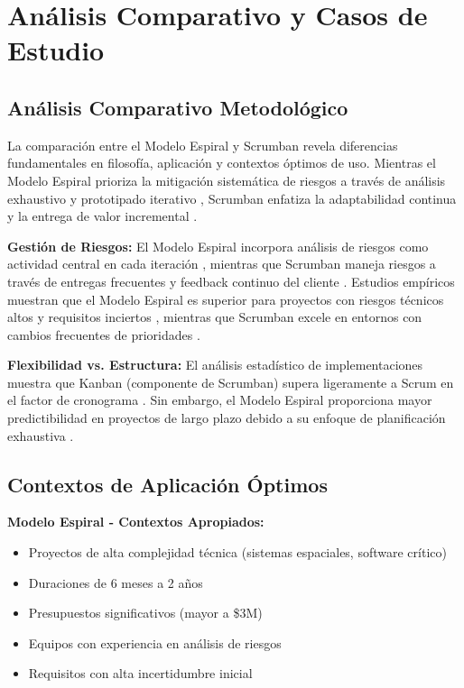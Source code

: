 \documentclass[conference]{IEEEtran}
\begin{document}
\section{Análisis Comparativo y Casos de Estudio}

\subsection{Análisis Comparativo Metodológico}

La comparación entre el Modelo Espiral y Scrumban revela diferencias fundamentales en filosofía, aplicación y contextos óptimos de uso. Mientras el Modelo Espiral prioriza la mitigación sistemática de riesgos a través de análisis exhaustivo y prototipado iterativo \cite{boehm1988spiral}, Scrumban enfatiza la adaptabilidad continua y la entrega de valor incremental \cite{atlassian_scrumban}.

\textbf{Gestión de Riesgos:}
El Modelo Espiral incorpora análisis de riesgos como actividad central en cada iteración \cite{boehm1988spiral}, mientras que Scrumban maneja riesgos a través de entregas frecuentes y feedback continuo del cliente \cite{sixsigma_scrumban}. Estudios empíricos muestran que el Modelo Espiral es superior para proyectos con riesgos técnicos altos y requisitos inciertos \cite{teaching_agile_spiral}, mientras que Scrumban excele en entornos con cambios frecuentes de prioridades \cite{ganjeizadeh2015statistical}.

\textbf{Flexibilidad vs. Estructura:}
El análisis estadístico de implementaciones muestra que Kanban (componente de Scrumban) supera ligeramente a Scrum en el factor de cronograma \cite{ganjeizadeh2015statistical}. Sin embargo, el Modelo Espiral proporciona mayor predictibilidad en proyectos de largo plazo debido a su enfoque de planificación exhaustiva \cite{nasa_trek_2002}.

\subsection{Contextos de Aplicación Óptimos}

\textbf{Modelo Espiral - Contextos Apropiados:}
\begin{itemize}
\item Proyectos de alta complejidad técnica (sistemas espaciales, software crítico) \cite{nasa_trek_2002}
\item Duraciones de 6 meses a 2 años \cite{ultimate_sdlc_spiral}
\item Presupuestos significativos (mayor a \$3M) \cite{ultimate_sdlc_spiral}
\item Equipos con experiencia en análisis de riesgos \cite{nelson_small_project}
\item Requisitos con alta incertidumbre inicial \cite{boehm1988spiral}
\end{itemize}
\end{document}
